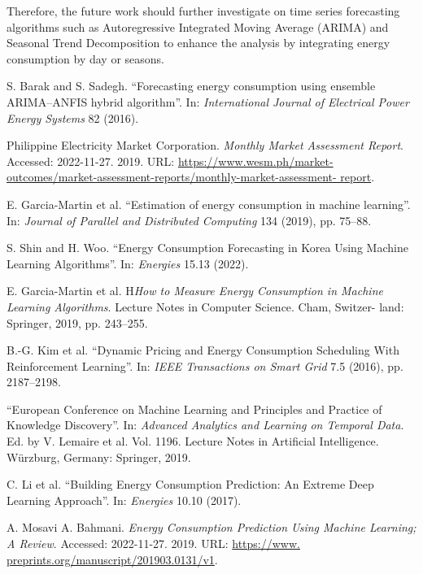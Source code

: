 \documentclass[runningheads]{llncs}
\begin{document}
Therefore, the future work should further investigate on time series forecasting algorithms such as Autoregressive Integrated Moving Average (ARIMA) and Seasonal Trend Decomposition to enhance the analysis by integrating energy consumption by day or seasons.




%
%
%
% 
% 
%
\begin{thebibliography}{15}
S. Barak and S. Sadegh. “Forecasting energy consumption using ensemble ARIMA–ANFIS hybrid algorithm”. In: \textit{International Journal of Electrical Power Energy Systems} 82 (2016).

Philippine Electricity Market Corporation. \textit{Monthly Market Assessment Report}. Accessed: 2022-11-27. 2019. URL: \url{https://www.wesm.ph/market- outcomes/market-assessment-reports/monthly-market-assessment- report}.

E. Garcia-Martin et al. “Estimation of energy consumption in machine learning”. In: \textit{Journal of Parallel and Distributed Computing} 134 (2019), pp. 75–88.

S. Shin and H. Woo. “Energy Consumption Forecasting in Korea Using Machine Learning Algorithms”. In: \textit{Energies} 15.13 (2022).

E. Garcia-Martin et al. H\textit{How to Measure Energy Consumption in Machine Learning Algorithms}. Lecture Notes in Computer Science. Cham, Switzer- land: Springer, 2019, pp. 243–255.

B.-G. Kim et al. “Dynamic Pricing and Energy Consumption Scheduling With Reinforcement Learning”. In: \textit{IEEE Transactions on Smart Grid} 7.5 (2016), pp. 2187–2198.

“European Conference on Machine Learning and Principles and Practice of Knowledge Discovery”. In: \textit{Advanced Analytics and Learning on Temporal Data}. Ed. by V. Lemaire et al. Vol. 1196. Lecture Notes in Artificial Intelligence. Würzburg, Germany: Springer, 2019.

C. Li et al. “Building Energy Consumption Prediction: An Extreme Deep Learning Approach”. In: \textit{Energies} 10.10 (2017).

A. Mosavi A. Bahmani. \textit{Energy Consumption Prediction Using Machine Learning; A Review}. Accessed: 2022-11-27. 2019. URL: \url{https://www. preprints.org/manuscript/201903.0131/v1}.


\end{thebibliography}
\end{document}
